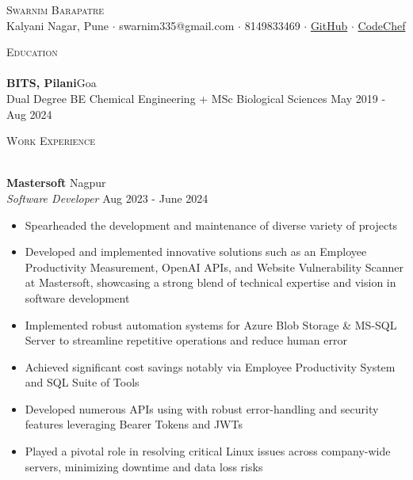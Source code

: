 \documentclass[a4paper]{article}
\newcommand{\lineunder} {
    \vspace*{-8pt} \\
    \hspace*{-18pt} \hrulefill \\
}
\newcommand{\header} [1] {
    {\hspace*{-18pt}\vspace*{6pt} \textsc{#1}}
    \vspace*{-6pt} \lineunder
}
\begin{document}
    \vspace*{-40pt}

\vspace*{-10pt}
\begin{center}
  {\Huge \scshape {Swarnim Barapatre}}\\
  Kalyani Nagar, Pune $\cdot$ swarnim335@gmail.com $\cdot$ 8149833469 $\cdot$ \href{https://github.com/swarnimcodes/}{GitHub} $\cdot$ \href{https://www.codechef.com/users/b_swarniim}{CodeChef} \\
\end{center}

      \header{Education}

      \textbf{BITS, Pilani}\hfill Goa\\
Dual Degree BE Chemical Engineering + MSc Biological Sciences \hfill May 2019 - Aug 2024\\

\vspace{2mm}

      \header{Work Experience}
      \vspace{1mm}

      \textbf{Mastersoft} \hfill Nagpur\\
          \textit{Software Developer} \hfill Aug 2023 - June 2024\\
          \vspace{-1mm}
      \begin{itemize} \itemsep 1pt
            \item Spearheaded the development and maintenance of diverse variety of projects
            \item Developed and implemented innovative solutions such as an Employee Productivity Measurement, OpenAI APIs, and 
            Website Vulnerability Scanner at Mastersoft, 
            showcasing a strong blend of technical expertise and vision in software development
            \item Implemented robust automation systems for Azure Blob Storage \& MS-SQL Server to streamline repetitive operations and reduce human error
            \item Achieved significant cost savings notably via Employee Productivity System and SQL Suite of Tools
            \item Developed numerous APIs using with robust error-handling and security features leveraging Bearer Tokens and JWTs
            \item Played a pivotal role in resolving critical Linux issues across company-wide servers, minimizing downtime and data loss risks
      \end{itemize}
\end{document}
